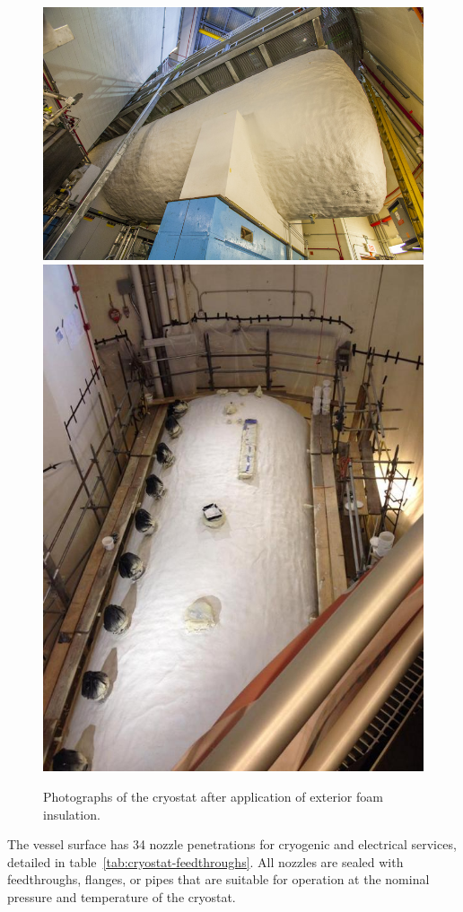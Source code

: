 \begin{figure}[htb]
\centering	
\includegraphics[width=0.45\linewidth]{figures/14-0222-03D.jpg}
\includegraphics[width=0.45\linewidth]{figures/foam2.jpg}
\caption{Photographs of the cryostat after application of exterior foam insulation.}
\label{fig:cryostat-foam}
\end{figure}


The vessel surface has 34 nozzle penetrations for cryogenic and electrical services, detailed in table~\ref{tab:cryostat-feedthroughs}.  All nozzles are sealed with feedthroughs, flanges, or pipes that are suitable for operation at the nominal pressure and temperature of the cryostat.  

